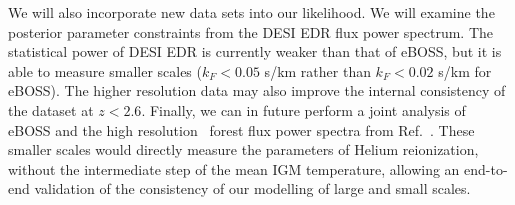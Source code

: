 We will also incorporate new data sets into our likelihood. We will examine the posterior parameter constraints from the DESI EDR flux power spectrum. The statistical power of DESI EDR is currently weaker than that of eBOSS, but it is able to measure smaller scales ($k_F < 0.05$ s/km rather than $k_F < 0.02$ s/km for eBOSS). The higher resolution data may also improve the internal consistency of the dataset at $z < 2.6$. Finally, we can in future perform a joint analysis of eBOSS and the high resolution \Lya~forest flux power spectra from Ref.~\cite{2022MNRAS.509.2842K}. These smaller scales would directly measure the parameters of Helium reionization, without the intermediate step of the mean IGM temperature, allowing an end-to-end validation of the consistency of our modelling of large and small scales.